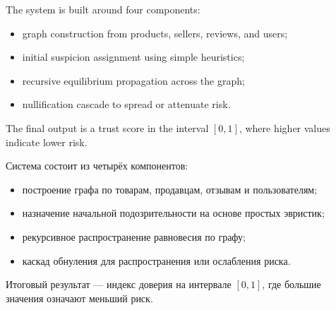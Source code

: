 \documentclass[12pt,a4paper]{article}
\begin{document}
The system is built around four components:
\begin{itemize}
    \item graph construction from products, sellers, reviews, and users;
    \item initial suspicion assignment using simple heuristics;
    \item recursive equilibrium propagation across the graph;
    \item nullification cascade to spread or attenuate risk.
\end{itemize}
The final output is a trust score in the interval $[0,1]$, where higher values indicate lower risk.

Система состоит из четырёх компонентов:
\begin{itemize}
    \item построение графа по товарам, продавцам, отзывам и пользователям;
    \item назначение начальной подозрительности на основе простых эвристик;
    \item рекурсивное распространение равновесия по графу;
    \item каскад обнуления для распространения или ослабления риска.
\end{itemize}
Итоговый результат — индекс доверия на интервале $[0,1]$, где большие значения означают меньший риск.
\end{document}

